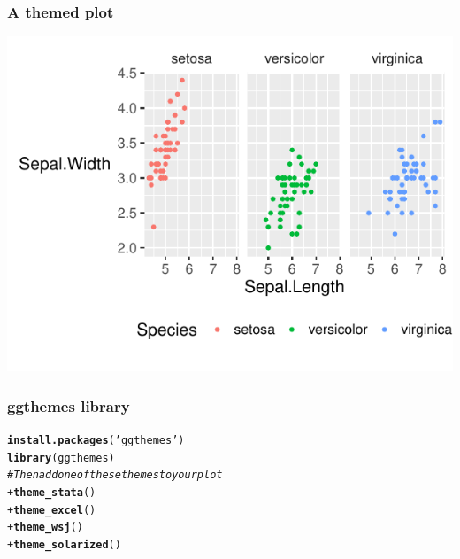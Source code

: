 \documentclass{beamer}\usepackage[]{graphicx}\usepackage[]{color}
\makeatletter
\newcommand{\hlstr}[1]{\textcolor[rgb]{0.192,0.494,0.8}{#1}}%
\newcommand{\hlcom}[1]{\textcolor[rgb]{0.678,0.584,0.686}{\textit{#1}}}%
\newcommand{\hlopt}[1]{\textcolor[rgb]{0,0,0}{#1}}%
\newcommand{\hlstd}[1]{\textcolor[rgb]{0.345,0.345,0.345}{#1}}%
\newcommand{\hlkwd}[1]{\textcolor[rgb]{0.737,0.353,0.396}{\textbf{#1}}}%
\newenvironment{kframe}{%
 \def\at@end@of@kframe{}%
 \ifinner\ifhmode%
  \def\at@end@of@kframe{\end{minipage}}%
  \begin{minipage}{\columnwidth}%
 \fi\fi%
 \def\FrameCommand##1{\hskip\@totalleftmargin \hskip-\fboxsep
 \colorbox{shadecolor}{##1}\hskip-\fboxsep
     \hskip-\linewidth \hskip-\@totalleftmargin \hskip\columnwidth}%
 \MakeFramed {\advance\hsize-\width
   \@totalleftmargin\z@ \linewidth\hsize
   \@setminipage}}%
 {\par\unskip\endMakeFramed%
 \at@end@of@kframe}
\newenvironment{knitrout}{}{} %
\makeatother
\begin{document}

\begin{frame}[fragile]
\frametitle{A themed plot}
\begin{knitrout}\footnotesize
{}\color{fgcolor}
\includegraphics[width=.75\linewidth]{figure/facet_wrap_theme_execc-1} 

\end{knitrout}
\end{frame}


\begin{frame}[fragile]
\frametitle{ggthemes library}
\begin{knitrout}\footnotesize
{}\color{fgcolor}\begin{kframe}
\begin{alltt}
\hlkwd{install.packages}\hlstd{(}\hlstr{'ggthemes'}\hlstd{)}
\hlkwd{library}\hlstd{(ggthemes)}
\hlcom{# Then add one of these themes to your plot}
 \hlopt{+} \hlkwd{theme_stata}\hlstd{()}
 \hlopt{+} \hlkwd{theme_excel}\hlstd{()}
 \hlopt{+} \hlkwd{theme_wsj}\hlstd{()}
 \hlopt{+} \hlkwd{theme_solarized}\hlstd{()}
\end{alltt}
\end{kframe}
\end{knitrout}
\end{frame}

\end{document}
